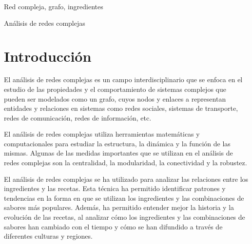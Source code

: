 \documentclass[a4paper]{article}
\begin{document}
\begin{keywords}
	Red compleja, grafo, ingredientes
\end{keywords}

\begin{topics}
	Análisis de redes complejas
\end{topics}


\vspace{0.8cm}



\section{Introducción}\label{sec:intro}

El análisis de redes complejas es un campo interdisciplinario que se enfoca en
el estudio de las propiedades y el comportamiento de sistemas complejos que
pueden ser modelados como un grafo, cuyos nodos y enlaces a representan
entidades y relaciones en sistemas como redes sociales, sistemas de transporte,
redes de comunicación, redes de información, etc.
\cite{boccaletti2006complex}

El análisis de redes complejas utiliza herramientas matemáticas y
computacionales para estudiar la estructura, la dinámica y la función de las 
mismas. Algunas de las medidas importantes que se utilizan en el análisis de
redes complejas son la centralidad, la modularidad, la conectividad y la
robustez.\cite{costa2007characterization}

El análisis de redes complejas se ha utilizado para analizar las relaciones
entre los ingredientes y las recetas. Esta técnica ha permitido identificar
patrones y tendencias en la forma en que se utilizan los ingredientes y las
combinaciones de sabores más populares. Además, ha permitido entender mejor la
historia y la evolución de las recetas, al analizar cómo los ingredientes y las
combinaciones de sabores han cambiado con el tiempo y cómo se han difundido a
través de diferentes culturas y regiones. \cite{ahn2011flavor, herrera2021contribution}
\end{document}
